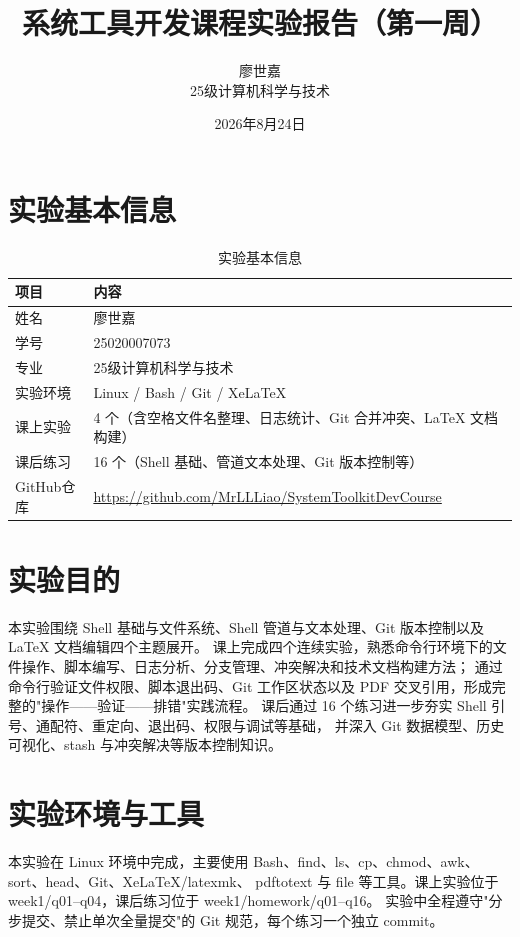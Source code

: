 \documentclass[UTF8]{ctexart}
\title{\textbf{系统工具开发课程实验报告（第一周）}}
\author{廖世嘉 \quad 25020007073 \\ 25级计算机科学与技术}
\date{2026年8月24日}
\begin{document}
\maketitle
\tableofcontents
\newpage

\section{实验基本信息}

\begin{table}[H]
\centering
\caption{实验基本信息}
\label{tab:info}
\begin{tabular}{ll}
\toprule
项目 & 内容 \\
\midrule
姓名 & 廖世嘉 \\
学号 & 25020007073 \\
专业 & 25级计算机科学与技术 \\
实验环境 & Linux / Bash / Git / XeLaTeX \\
课上实验 & 4 个（含空格文件名整理、日志统计、Git 合并冲突、LaTeX 文档构建）\\
课后练习 & 16 个（Shell 基础、管道文本处理、Git 版本控制等）\\
GitHub仓库 & \href{https://github.com/MrLLLiao/SystemToolkitDevCourse}{https://github.com/MrLLLiao/SystemToolkitDevCourse} \\
\bottomrule
\end{tabular}
\end{table}

\section{实验目的}

本实验围绕 Shell 基础与文件系统、Shell 管道与文本处理、Git 版本控制以及 LaTeX 文档编辑四个主题展开。
课上完成四个连续实验，熟悉命令行环境下的文件操作、脚本编写、日志分析、分支管理、冲突解决和技术文档构建方法；
通过命令行验证文件权限、脚本退出码、Git 工作区状态以及 PDF 交叉引用，形成完整的"操作——验证——排错"实践流程。
课后通过 16 个练习进一步夯实 Shell 引号、通配符、重定向、退出码、权限与调试等基础，
并深入 Git 数据模型、历史可视化、stash 与冲突解决等版本控制知识。

\section{实验环境与工具}

本实验在 Linux 环境中完成，主要使用 Bash、find、ls、cp、chmod、awk、sort、head、Git、XeLaTeX/latexmk、
pdftotext 与 file 等工具。课上实验位于 week1/q01--q04，课后练习位于 week1/homework/q01--q16。
实验中全程遵守"分步提交、禁止单次全量提交"的 Git 规范，每个练习一个独立 commit。
\end{document}
